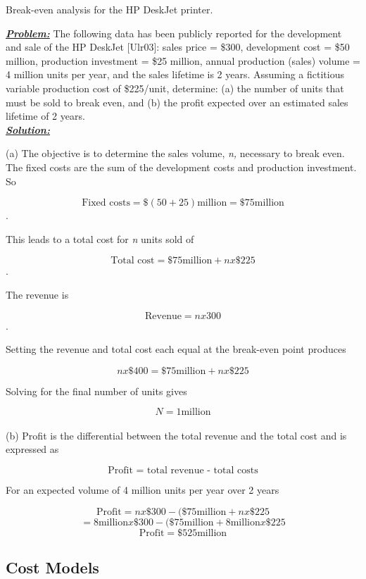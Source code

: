 \begin{example}{ Break-even analysis for the HP DeskJet printer.}
\label{example:projectManagementBreakEvenHpPrinter}

\emph{\textbf{\ul{Problem:}}} The following data has been publicly
reported for the development and sale of the HP DeskJet {[}Ulr03{]}:
sales price = \$300, development cost = \$50 million, production
investment = \$25 million, annual production (sales) volume = 4 million
units per year, and the sales lifetime is 2 years. Assuming a fictitious
variable production cost of \$225/unit, determine: (a) the number of
units that must be sold to break even, and (b) the profit expected over
an estimated sales lifetime of 2 years.\\

\emph{\textbf{\ul{Solution:}}}

(a) The objective is to determine the sales volume, \emph{n,} necessary
to break even. The fixed costs are the sum of the development costs and
production investment. So

$$\text{Fixed costs} = \$(50+25) \text{million} = \$75 \text{million}$$.

This leads to a total cost for \emph{n} units sold of

$$\text{Total cost} = \$75 \text{million} + n x \$225$$.

The revenue is

$$\text{Revenue} = n x 300$$.

Setting the revenue and total cost each equal at the break-even point
produces

$$n x \$400 = \$75 \text{million} + n x \$225$$

Solving for the final number of units gives

$$N = 1 \text{million}$$\\

(b) Profit is the differential between the total revenue and the total
cost and is expressed as

$$ \text{Profit = total revenue - total costs}$$

For an expected volume of 4 million units per year over 2 years

$$\text{Profit} = n x \$300 - (\$ 75 \text{million} + n x \$225$$
$$   = 8 \text{million} x \$300 - (\$ 75 \text{million} + 8 \text{million} x \$225$$
$$\text{Profit} = \$525 \text{million}$$
\end{example}

\subsection{Cost Models}
\label{subsection:cost-models}

